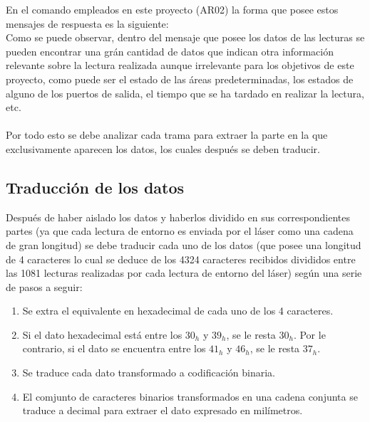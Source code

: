 En el comando empleados en este proyecto (AR02) la forma que posee estos mensajes de respuesta es la siguiente:\\
Como se puede observar, dentro del mensaje que posee los datos de las lecturas se pueden encontrar una grán cantidad de datos que indican otra información relevante sobre la lectura realizada aunque irrelevante para los objetivos de este proyecto, como puede ser el estado de las áreas predeterminadas, los estados de alguno de los puertos de salida, el tiempo que se ha tardado en realizar la lectura, etc.\\
\\
Por todo esto se debe analizar cada trama para extraer la parte en la que exclusivamente aparecen los datos, los cuales después se deben traducir.

\subsection{Traducción de los datos}

Después de haber aislado los datos y haberlos dividido en sus correspondientes partes (ya que cada lectura de entorno es enviada por el láser como una cadena de gran longitud) se debe traducir cada uno de los datos (que posee una longitud de 4 caracteres lo cual se deduce de los 4324 caracteres recibidos divididos entre las 1081 lecturas realizadas por cada lectura de entorno del láser) según una serie de pasos a seguir:
\begin{enumerate}
	\item Se extra el equivalente en hexadecimal de cada uno de los 4 caracteres.
	\item Si el dato hexadecimal está entre los $30_{h}$ y  $39_{h}$, se le resta  $30_{h}$. Por le contrario, si el dato se encuentra entre los  $41_{h}$ y  $46_{h}$, se le resta $37_{h}$.
	\item Se traduce cada dato transformado a codificación binaria.
	\item El comjunto de caracteres binarios transformados en una cadena conjunta se traduce a decimal para extraer el dato expresado en milímetros.
\end{enumerate}

